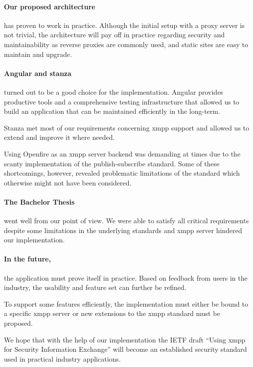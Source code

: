 \paragraph{Our proposed architecture} has proven to work in practice.
Although the initial setup with a proxy server is not trivial, the architecture will pay off in practice regarding security and maintainability as reverse proxies are commonly used, and static sites are easy to maintain and upgrade.

\paragraph{Angular and stanza} turned out to be a good choice for the implementation.
Angular provides productive tools and a comprehensive testing infrastructure that allowed us to build an application that can be maintained efficiently in the long-term.

Stanza met most of our requirements concerning \gls{xmpp} support and allowed us to extend and improve it where needed.

Using Openfire as an \gls{xmpp} server backend was demanding at times due to the scanty implementation of the \gls{publish-subscribe} standard.
Some of these shortcomings, however, revealed problematic limitations of the standard which otherwise might not have been considered.

\paragraph{The Bachelor Thesis} went well from our point of view.
We were able to satisfy all critical requirements despite some limitations in the underlying standards and \gls{xmpp} server hindered our implementation.

\paragraph{In the future,} the application must prove itself in practice.
Based on feedback from users in the industry, the usability and feature set can further be refined.

To support some features efficiently, the implementation must either be bound to a specific \gls{xmpp} server or new extensions to the \gls{xmpp} standard must be proposed.

We hope that with the help of our implementation the IETF draft ``Using \gls{xmpp} for Security Information Exchange'' will become an established security standard used in practical industry applications.
